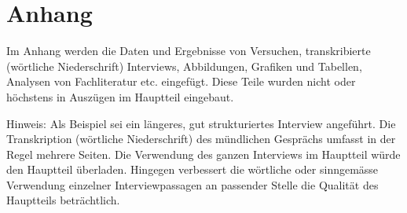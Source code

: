 \part{Anhang}
Im Anhang werden die Daten und Ergebnisse von Versuchen, transkribierte (wörtliche Niederschrift) Interviews, Abbildungen, Grafiken und Tabellen, Analysen von Fachliteratur etc. eingefügt. Diese Teile wurden nicht oder höchstens in Auszügen im Hauptteil eingebaut.

Hinweis:
Als Beispiel sei ein längeres, gut strukturiertes Interview angeführt. Die Transkription (wörtliche Niederschrift) des mündlichen Gesprächs umfasst in der Regel mehrere Seiten. Die Verwendung des ganzen Interviews im Hauptteil würde den Hauptteil überladen. Hingegen verbessert die wörtliche oder sinngemässe Verwendung einzelner Interviewpassagen an passender Stelle die Qualität des Hauptteils beträchtlich.
   